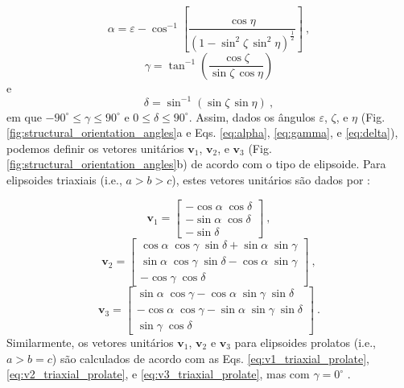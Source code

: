 \begin{equation}
\alpha = \varepsilon - \cos^{-1} \left[ \frac{\cos \eta}
{\left( 1 - \sin^{2} \zeta \, \sin^{2} \eta \right)^{\frac{1}{2}}}\right] \: ,
\label{eq:alpha}
\end{equation}
\begin{equation}
\gamma = \tan^{-1} \left( \frac{\cos \zeta}{\sin \zeta \, \cos \eta}\right)
\label{eq:gamma}
\end{equation}
e
\begin{equation}
\delta = \sin^{-1} \left( \sin \zeta \, \sin \eta \right) \: ,
\label{eq:delta}
\end{equation}
em que $-90^{\circ} \leq \gamma \leq 90^{\circ}$ e $0 \leq \delta \leq 90^{\circ}$. Assim, dados os ângulos $\varepsilon$, $\zeta$, e $\eta$ (Fig. \ref{fig:structural_orientation_angles}a e Eqs. \ref{eq:alpha}, \ref{eq:gamma}, e
\ref{eq:delta}), podemos definir os vetores unitários
$\mathbf{v}_{1}$, $\mathbf{v}_{2}$, e $\mathbf{v}_{3}$
(Fig. \ref{fig:structural_orientation_angles}b) de acordo com o tipo de elipsoide.
Para elipsoides triaxiais (i.e., $a > b > c$), estes vetores unitários são dados por \citep{clark1986}:

\begin{equation}
\mathbf{v}_{1} = \left[\begin{array}{c} 
-\cos\alpha \; \cos\delta \\
-\sin\alpha \; \cos\delta \\
-\sin\delta
\end{array} \right] \: ,
\label{eq:v1_triaxial_prolate}
\end{equation}
\begin{equation}
\mathbf{v}_{2} = \left[\begin{array}{c} 
\cos\alpha \; \cos\gamma \; \sin\delta + \sin\alpha \; \sin\gamma \\                   
\sin\alpha \; \cos\gamma \; \sin\delta - \cos\alpha \; \sin\gamma \\ 
-\cos\gamma \; \cos\delta
\end{array} \right] \: ,
\label{eq:v2_triaxial_prolate}
\end{equation}                   
\begin{equation}                    
\mathbf{v}_{3} = \left[\begin{array}{c} 
\sin\alpha \; \cos\gamma - \cos\alpha \; \sin\gamma \; \sin\delta \\                    
-\cos\alpha \; \cos\gamma - \sin\alpha \; \sin\gamma \; \sin\delta \\
\sin\gamma \; \cos\delta
\end{array} \right] \: .
\label{eq:v3_triaxial_prolate}
\end{equation}
Similarmente, os vetores unitários $\mathbf{v}_{1}$, $\mathbf{v}_{2}$ e $\mathbf{v}_{3}$ para elipsoides prolatos (i.e., $a > b = c$) são calculados de acordo com as Eqs.
\ref{eq:v1_triaxial_prolate}, \ref{eq:v2_triaxial_prolate}, e
\ref{eq:v3_triaxial_prolate}, mas com $\gamma = 0^{\circ}$ 
\citep{emerson1985}.

